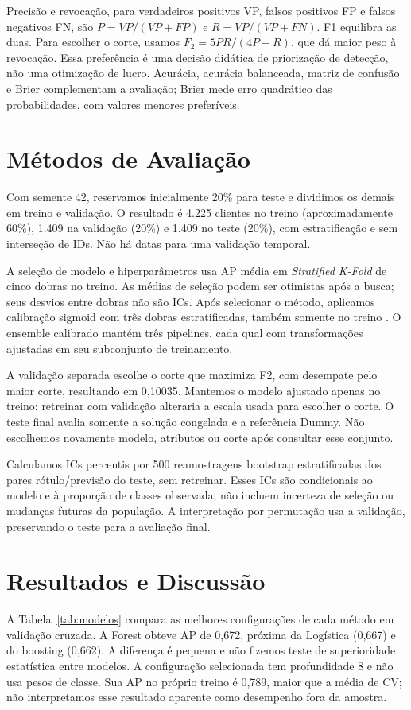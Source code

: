 \documentclass[12pt]{article}
\begin{document}
Precisão e revocação, para verdadeiros positivos VP, falsos positivos FP e falsos negativos FN, são $P=VP/(VP+FP)$ e $R=VP/(VP+FN)$. F1 equilibra as duas. Para escolher o corte, usamos $F_2=5PR/(4P+R)$, que dá maior peso à revocação. Essa preferência é uma decisão didática de priorização de detecção, não uma otimização de lucro. Acurácia, acurácia balanceada, matriz de confusão e Brier complementam a avaliação; Brier mede erro quadrático das probabilidades, com valores menores preferíveis.

\section{Métodos de Avaliação}\label{sec:avaliacao}
Com semente 42, reservamos inicialmente 20\% para teste e dividimos os demais em treino e validação. O resultado é 4.225 clientes no treino (aproximadamente 60\%), 1.409 na validação (20\%) e 1.409 no teste (20\%), com estratificação e sem interseção de IDs. Não há datas para uma validação temporal.

A seleção de modelo e hiperparâmetros usa AP média em \textit{Stratified K-Fold} de cinco dobras no treino. As médias de seleção podem ser otimistas após a busca; seus desvios entre dobras não são ICs. Após selecionar o método, aplicamos calibração sigmoid com três dobras estratificadas, também somente no treino \cite{calibracao}. O ensemble calibrado mantém três pipelines, cada qual com transformações ajustadas em seu subconjunto de treinamento.

A validação separada escolhe o corte que maximiza F2, com desempate pelo maior corte, resultando em 0,10035. Mantemos o modelo ajustado apenas no treino: retreinar com validação alteraria a escala usada para escolher o corte. O teste final avalia somente a solução congelada e a referência Dummy. Não escolhemos novamente modelo, atributos ou corte após consultar esse conjunto.

Calculamos ICs percentis por 500 reamostragens bootstrap estratificadas dos pares rótulo/previsão do teste, sem retreinar. Esses ICs são condicionais ao modelo e à proporção de classes observada; não incluem incerteza de seleção ou mudanças futuras da população. A interpretação por permutação usa a validação, preservando o teste para a avaliação final.

\section{Resultados e Discussão}\label{sec:resultados}
A Tabela~\ref{tab:modelos} compara as melhores configurações de cada método em validação cruzada. A Forest obteve AP de 0,672, próxima da Logística (0,667) e do boosting (0,662). A diferença é pequena e não fizemos teste de superioridade estatística entre modelos. A configuração selecionada tem profundidade 8 e não usa pesos de classe. Sua AP no próprio treino é 0,789, maior que a média de CV; não interpretamos esse resultado aparente como desempenho fora da amostra.
\end{document}
